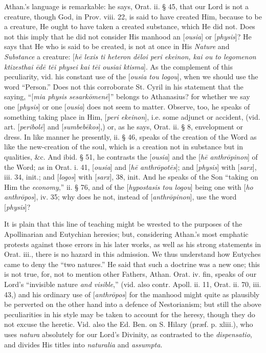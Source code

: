 Athan.'s language is remarkable: he says, Orat.
ii. § 45, that our Lord is not a creature, though God, in Prov. viii.
22, is said to have created Him, because to be a creature, He ought to
have taken a created substance, which He did not. Does not this imply
that he did not consider His manhood an [\emph{ousia}] or [\emph{physis}]?
He says that He who is said to be created, is not at once in His \emph{Nature} and \emph{Substance} a creature: [\emph{h\={e} lexis ti
heteron d\={e}loi peri ekeinon, kai ou to legomenon ktizesthai \={e}d\={e}
t\={e}i physei kai t\={e}i ousiai ktisma}]. As the complement
of this peculiarity, vid. his constant use of the [\emph{ousia tou logou}],
when we should use the word ``Person.'' Does not this corroborate St.
Cyril in his statement that the saying, ``[\emph{mia physis sesark\={o}men\={e}}]''
belongs to Athanasius? for whether we say one [\emph{physis}] or one [\emph{ousia}]
does not seem to matter. Observe, too, he speaks of something taking
place in Him, [\emph{peri ekeinon}], i.e. some adjunct or accident, (vid.
art. [\emph{peribol\={e}}] and [\emph{sumbeb\={e}kos}],) or, as
he says, Orat. ii. § 8, envelopment or dress. In like manner he
presently, ii. § 46, speaks of the creation of the Word as like the
new-creation of the soul, which is a creation not in substance but in
qualities, \&c. And ibid. § 51, he contrasts the [\emph{ousia}]
and the [\emph{h\={e} anthr\={o}pinon}] of the Word; as in Orat.
i. 41, [\emph{ousia}] and [\emph{h\={e} anthr\={o}pot\={e}s}];
and [\emph{physis}] with [\emph{sarx}], iii. 34, init.; and [\emph{logos}]
with [\emph{sarx}], 38, init. And he speaks of the Son ``taking on Him
the \emph{economy},'' ii. § 76, and of the [\emph{hypostasis tou logou}]
being one with [\emph{ho anthr\={o}pos}], iv. 35; why does he not,
instead of [\emph{anthr\={o}pinon}], use the word [\emph{physis}]?

It is plain that this line of teaching might be
wrested to the purposes of the Apollinarian and Eutychian heresies;
but, considering Athan.'s most emphatic protests against those errors
in his later works, as well as his strong statements in Orat. iii.,
there is no hazard in this admission. We thus understand how Eutyches
came to deny the ``two natures.'' He said that such a doctrine was a new
one; this is not true, for, not to mention other Fathers, Athan. Orat.
iv. fin, speaks of our Lord's ``invisible nature \emph{and visible},''
(vid. also contr. Apoll. ii. 11, Orat. ii. 70, iii. 43,) and his
ordinary use of [\emph{anthr\={o}pos}] for the manhood might quite
as plausibly be perverted on the other hand into a defence of
Nestorianism; but still the above peculiarities in his style may be
taken to account for the heresy, though they do not excuse the
heretic. Vid. also the Ed. Ben. on S. Hilary (præf. p. xliii.), who
uses \emph{natura} absolutely for our Lord's Divinity, as contrasted
to the \emph{dispensatio}, and divides His titles into \emph{naturalia}
and \emph{assumpta}.

